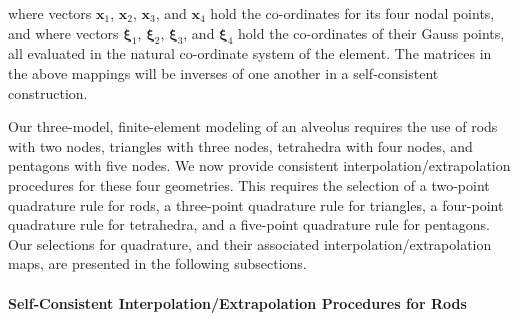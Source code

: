 where vectors $\boldsymbol{x}_1$, $\boldsymbol{x}_2$, $\boldsymbol{x}_3$, and $\boldsymbol{x}_4$ hold the co-ordinates for its four nodal points, and where vectors $\boldsymbol{\xi}_1$, $\boldsymbol{\xi}_2$, $\boldsymbol{\xi}_3$, and $\boldsymbol{\xi}_4$ hold the co-ordinates of their Gauss points, all evaluated in the natural co-ordinate system of the element.  The matrices in the above mappings will be inverses of one another in a self-consistent construction.
\addtocounter{equation}{-1}

Our three-model, finite-element modeling of an alveolus requires the use of rods with two nodes, triangles with three nodes, tetrahedra with four nodes, and pentagons with five nodes.  We now provide consistent interpolation\slash extrapolation procedures for these four geometries.  This requires the selection of a two-point quadrature rule for rods, a three-point quadrature rule for triangles, a four-point quadrature rule for tetrahedra, and a five-point quadrature rule for pentagons.  Our selections for quadrature, and their associated interpolation\slash extrapolation maps, are presented in the following subsections.

\paragraph{Self-Consistent Interpolation\slash Extrapolation Procedures for Rods}

